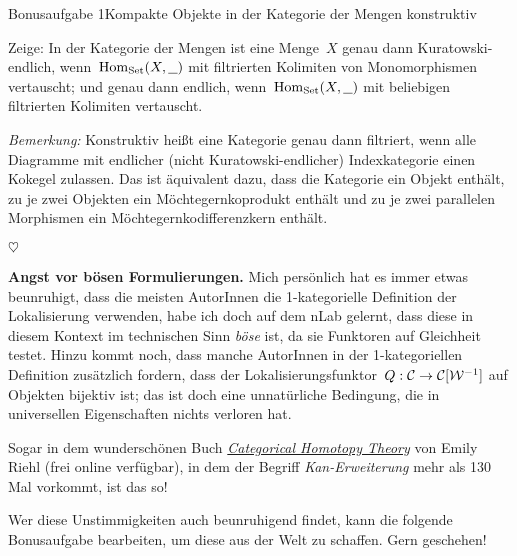 \documentclass{uebblatt}
\newcommand{\stopper}{\begin{center}$\heartsuit$\end{center}}
\begin{document}
\begin{aufgabe*}{Bonusaufgabe 1}{Kompakte Objekte in der Kategorie der Mengen konstruktiv}

Zeige: In der Kategorie der Mengen ist eine Menge~$X$ genau dann
Kuratowski-endlich, wenn~$\mathrm{Hom}_{\mathrm{Set}}(X,\underline{\ \ })$ mit filtrierten
Kolimiten von Monomorphismen vertauscht; und genau dann endlich,
wenn~$\mathrm{Hom}_{\mathrm{Set}}(X,\underline{\ \ })$ mit beliebigen filtrierten Kolimiten
vertauscht.

\emph{Bemerkung:} Konstruktiv heißt eine Kategorie genau dann filtriert, wenn
alle Diagramme mit endlicher (nicht Kuratowski-endlicher) Indexkategorie einen
Kokegel zulassen. Das ist äquivalent dazu, dass die Kategorie ein Objekt
enthält, zu je zwei Objekten ein Möchtegernkoprodukt enthält und zu je zwei
parallelen Morphismen ein Möch\-te\-gern\-ko\-dif\-fe\-renz\-kern enthält.
\end{aufgabe*}
\vspace{-1em}

\stopper

\textbf{Angst vor bösen Formulierungen.}
Mich persönlich hat es immer etwas beunruhigt, dass die meisten AutorInnen die
1-kategorielle Definition der Lokalisierung verwenden, habe ich doch auf dem
nLab gelernt, dass diese in diesem Kontext im technischen Sinn \emph{böse} ist,
da sie Funktoren auf Gleichheit testet. Hinzu kommt noch, dass manche AutorInnen
in der 1-kategoriellen Definition zusätzlich fordern, dass der
Lokalisierungsfunktor~$Q : \mathcal{C} \to \mathcal{C}[\mathcal{W}^{-1}]$ auf Objekten bijektiv ist; das
ist doch eine unnatürliche Bedingung, die in universellen Eigenschaften nichts
verloren hat.

Sogar in dem wunderschönen Buch
\href{http://www.math.harvard.edu/~eriehl/cathtpy.pdf}{\emph{Categorical
Homotopy Theory}} von Emily
Riehl (frei online verfügbar), in dem der Begriff \emph{Kan-Erweiterung} mehr als 130 Mal vorkommt,
ist das so!

Wer diese Unstimmigkeiten auch beunruhigend findet, kann die folgende
Bonusaufgabe bearbeiten, um diese aus der Welt zu schaffen. Gern geschehen!
\end{document}
